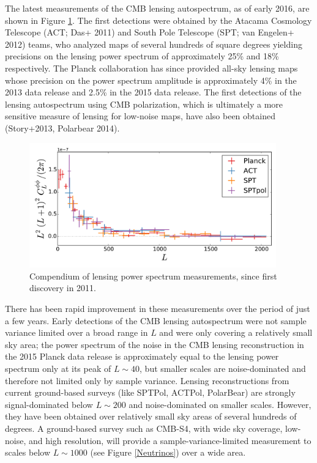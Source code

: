 The latest measurements of the CMB lensing autospectrum, as of early 2016, are shown in Figure \ref{CMBLensPower}. The first detections were obtained by the Atacama Cosmology Telescope (ACT; Das+ 2011) and South Pole Telescope  (SPT; van Engelen+ 2012) teams, who analyzed maps of several hundreds of square degrees yielding precisions on the lensing power spectrum of approximately 25\% and 18\% respectively.  The Planck collaboration has since provided all-sky lensing maps whose precision on the power spectrum amplitude is approximately 4\% in the 2013 data release and 2.5\% in the 2015 data release.  The first detections of the lensing autospectrum using CMB polarization, which is ultimately a more sensitive measure of lensing for low-noise maps,  have also been obtained (Story+2013, Polarbear 2014).

\begin{figure}[htbp]
\centering
\includegraphics[width=0.95\textwidth]{CMBLensing/autoCompilation}
\caption{Compendium of lensing power spectrum measurements, since first discovery in 2011.} 
\label{CMBLensPower}
\end{figure}

There has been rapid improvement in these measurements over the period of just a few years. 
Early detections of the CMB lensing autospectrum were not sample variance limited over a broad range in $L$ and were only covering a relatively small sky area;  
the  power spectrum of the noise in the CMB lensing reconstruction  in the 2015 Planck data release is approximately equal to the lensing power spectrum only at its peak of $L \sim 40$, but smaller scales are noise-dominated and therefore not limited only by sample variance.  Lensing reconstructions from current ground-based surveys (like SPTPol, ACTPol, PolarBear) 
are strongly signal-dominated below $L \sim 200$ and noise-dominated on smaller scales.  However, they have been obtained over relatively small sky areas of several hundreds of degrees. A ground-based survey such as CMB-S4, with wide sky coverage, low-noise, and high resolution, will provide a sample-variance-limited measurement to scales below $L \sim 1000$ (see Figure \ref{Neutrinos}) over a wide area.  
 


